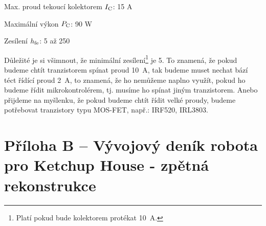 Max. proud tekoucí kolektorem $I \rm _C$: 15 A

Maximální výkon $P \rm _C$: 90 W

Zesílení $h \rm _{fe}$: 5 až 250

Důležité je si všimnout, že minimální zesílení\footnote{Platí pokud bude kolektorem protékat 10~A.}  je 5. 
To znamená, že pokud budeme chtít tranzistorem spínat proud 10~A, tak budeme muset nechat bází téct řídící proud 2~A,
 to znamená, že ho nemůžeme naplno využít, pokud ho budeme řídit mikrokontrolérem, tj. musíme ho spínat jiným tranzistorem. 
 Anebo přijdeme na myšlenku, že pokud budeme chtít řídit velké proudy, budeme potřebovat tranzistory typu MOS-FET, např.: IRF520, IRL3803.





\section*{Příloha B -- Vývojový deník robota pro Ketchup House - zpětná rekonstrukce }


